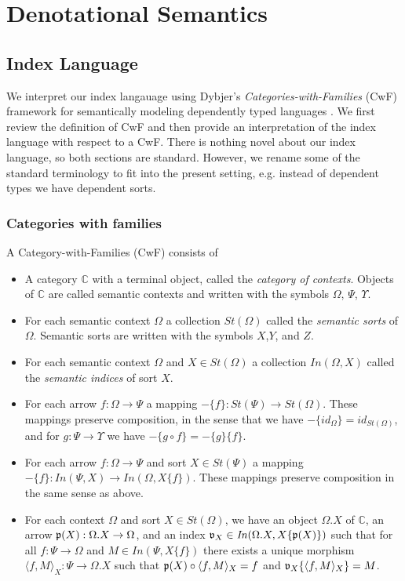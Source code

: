 \documentclass[sigplan,10pt,review,anonymous]{acmart}
\begin{document}
\section{Denotational Semantics}

\subsection{Index Language}

We interpret our index langauage using Dybjer's \emph{Categories-with-Families} (CwF) framework for semantically modeling dependently typed languages \cite{}. We first review the definition of CwF and then provide an interpretation of the index language with respect to a CwF. There is nothing novel about our index language, so both sections are standard. However, we rename some of the standard terminology to fit into the present setting, e.g. instead of dependent types we have dependent sorts.

\subsubsection{Categories with families}

A Category-with-Families (CwF) consists of 
\begin{itemize}
\item A category $\mathbb C$ with a terminal object, called the \emph{category of contexts}. Objects of $\mathbb C$ are called semantic contexts and written with the symbols $\Omega$, $\Psi$, $\Upsilon$.
\item For each semantic context $\Omega$ a collection $\mathit{St}(\Omega)$ called the \emph{semantic sorts} of $\Omega$. Semantic sorts are written with the symbols $X$,$Y$, and $Z$.
\item For each semantic context $\Omega$ and $X \in \mathit{St}(\Omega)$ a collection $\mathit{In}(\Omega,X)$ called the \emph{semantic indices} of sort $X$.
\item For each arrow $f : \Omega \to \Psi$ a mapping $- \{ f \} : \mathit{St}(\Psi) \to \mathit{St}(\Omega)$. These mappings preserve composition, in the sense that we have $- \{ \mathit{id}_{\Omega} \} = \mathit{id}_{\mathit{St}(\Omega)}$, and for $g : \Psi \to \Upsilon$ we have $- \{ g \circ f \} = - \{ g \} \{ f \}$.
\item For each arrow $f : \Omega \to \Psi$ and sort $X \in \mathit{St}(\Psi)$ a mapping $- \{ f \} : \mathit{In}(\Psi,X) \to \mathit{In}(\Omega,X \{ f \})$. These mappings preserve composition in the same sense as above.
\item For each context $\Omega$ and sort $X \in \mathit{St}(\Omega)$, we have an object $\Omega . X$ of $\mathbb C$, an arrow $\frak p(X) : \Omega . X \to \Omega$, and an index $\frak v_{X} \in \mathit{In}(\Omega . X, X \{ \frak p(X) \})$ such that for all $f : \Psi \to \Omega$ and $M \in \mathit{In}(\Psi, X \{ f \})$ there exists a unique morphism $\langle f , M \rangle_X : \Psi \to \Omega . X$ such that $\frak p(X) \circ \langle f , M \rangle_X = f$ and $\frak v_{X} \{ \langle f, M \rangle_X \} = M$.
\end{itemize}
\end{document}
